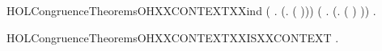 \begin{SaveVerbatim}{HOLCongruenceTheoremsOHXXCONTEXTXXind}
       (\HOLSymConst{\HOLTokenForall{}} .   \HOLSymConst{\HOLTokenImp{}}  (\HOLTokenLambda{}. \HOLConst{\ensuremath{\nu}}  ( ))) \HOLSymConst{\HOLTokenConj{}}
       (\HOLSymConst{\HOLTokenForall{}} .   \HOLSymConst{\HOLTokenImp{}}  (\HOLTokenLambda{}.  ( ) )) \HOLSymConst{\HOLTokenImp{}}
       \HOLSymConst{\HOLTokenForall{}}.   \HOLSymConst{\HOLTokenImp{}}  
\end{SaveVerbatim}
\newcommand{\HOLCongruenceTheoremsOHXXCONTEXTXXind}{\UseVerbatim{HOLCongruenceTheoremsOHXXCONTEXTXXind}}
\begin{SaveVerbatim}{HOLCongruenceTheoremsOHXXCONTEXTXXISXXCONTEXT}
\HOLTokenTurnstile{} \HOLSymConst{\HOLTokenForall{}}.   \HOLSymConst{\HOLTokenImp{}}  
\end{SaveVerbatim}
\newcommand{\HOLCongruenceTheoremsOHXXCONTEXTXXISXXCONTEXT}{\UseVerbatim{HOLCongruenceTheoremsOHXXCONTEXTXXISXXCONTEXT}}

